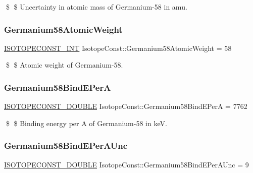 \$ \$ Uncertainty in atomic mass of Germanium-\/58 in amu. \mbox{\label{group___isotope_const-_germanium-_ge58_ga5db863c927d1391dff7e1e70fa0dcff1}} 
\subsubsection{\texorpdfstring{Germanium58\+Atomic\+Weight}{Germanium58AtomicWeight}}
{\footnotesize\ttfamily \mbox{\hyperlink{group___isotope_const-_macros_ga5f18360b3e99483a35c32d789e62621c}{I\+S\+O\+T\+O\+P\+E\+C\+O\+N\+S\+T\+\_\+\+I\+NT}} Isotope\+Const\+::\+Germanium58\+Atomic\+Weight = 58}

\$ \$ Atomic weight of Germanium-\/58. \mbox{\label{group___isotope_const-_germanium-_ge58_ga8a6cd7d5e5150436408b5a983421f439}} 
\subsubsection{\texorpdfstring{Germanium58\+Bind\+E\+PerA}{Germanium58BindEPerA}}
{\footnotesize\ttfamily \mbox{\hyperlink{group___isotope_const-_macros_ga8f45a7272ce02c0b4c65c44636ed719a}{I\+S\+O\+T\+O\+P\+E\+C\+O\+N\+S\+T\+\_\+\+D\+O\+U\+B\+LE}} Isotope\+Const\+::\+Germanium58\+Bind\+E\+PerA = 7762}

\$ \$ Binding energy per A of Germanium-\/58 in keV. \mbox{\label{group___isotope_const-_germanium-_ge58_gac609d1ec48f2887e0e82292ced98d093}} 
\subsubsection{\texorpdfstring{Germanium58\+Bind\+E\+Per\+A\+Unc}{Germanium58BindEPerAUnc}}
{\footnotesize\ttfamily \mbox{\hyperlink{group___isotope_const-_macros_ga8f45a7272ce02c0b4c65c44636ed719a}{I\+S\+O\+T\+O\+P\+E\+C\+O\+N\+S\+T\+\_\+\+D\+O\+U\+B\+LE}} Isotope\+Const\+::\+Germanium58\+Bind\+E\+Per\+A\+Unc = 9}

